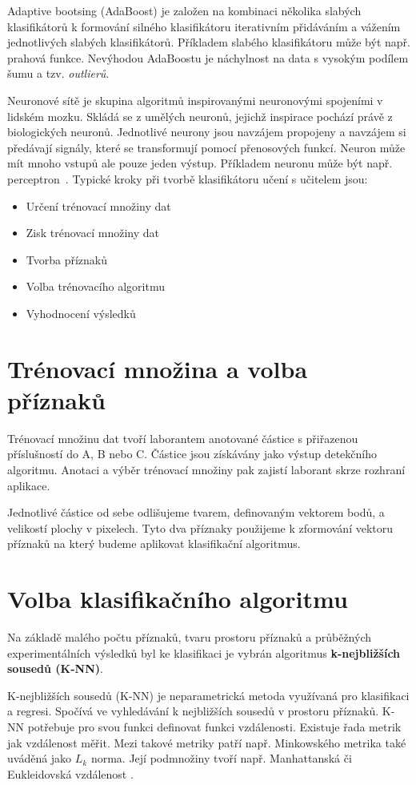 \documentclass[11pt,twoside,a4paper,table]{book}
\begin{document}
Adaptive bootsing (AdaBoost) je založen na kombinaci několika slabých klasifikátorů k formování silného klasifikátoru iterativním přidáváním a vážením jednotlivých slabých klasifikátorů. Příkladem slabého klasifikátoru může být např. prahová funkce. Nevýhodou AdaBoostu je náchylnost na data s vysokým podílem šumu a tzv. \textit{outlierů}.

Neuronové sítě je skupina algoritmů inspirovanými neuronovými spojeními v lidském mozku. Skládá se z umělých neuronů, jejichž inspirace pochází právě z biologických neuronů. Jednotlivé neurony jsou navzájem propojeny a navzájem si předávají signály, které se transformují pomocí přenosových funkcí. Neuron může mít mnoho vstupů ale pouze jeden výstup. Příkladem neuronu může být např. perceptron~\cite{art:neural_networks}. 
\newpage
Typické kroky při tvorbě klasifikátoru učení s učitelem jsou:
\begin{itemize}
\item Určení trénovací množiny dat
\item Zisk trénovací množiny dat
\item Tvorba příznaků
\item Volba trénovacího algoritmu
\item Vyhodnocení výsledků
\end{itemize}

\section{Trénovací množina a volba příznaků}
Trénovací množinu dat tvoří laborantem anotované částice s přiřazenou příslušností do A, B nebo C. Částice jsou získávány jako výstup detekčního algoritmu. Anotaci a výběr trénovací množiny pak zajistí laborant skrze rozhraní aplikace.

Jednotlivé částice od sebe odlišujeme tvarem, definovaným vektorem bodů, a velikostí plochy v pixelech. Tyto dva příznaky použijeme k zformování vektoru příznaků na který budeme aplikovat klasifikační algoritmus.

\section{Volba klasifikačního algoritmu}

Na základě malého počtu příznaků, tvaru prostoru příznaků a průběžných experimentálních výsledků byl ke klasifikaci je vybrán algoritmus \textbf{k-nejbližších sousedů (K-NN)}.

K-nejbližších sousedů (K-NN) je neparametrická metoda využívaná pro klasifikaci a regresi. Spočívá ve vyhledávání k nejbližších sousedů v prostoru příznaků. K-NN potřebuje pro svou funkci definovat funkci vzdálenosti. Existuje řada metrik jak vzdálenost měřit. Mezi takové metriky patří např. Minkowského metrika také uváděná jako $L_{k}$ norma. Její podmnožiny tvoří např. Manhattanská či Eukleidovská vzdálenost \cite{book:pattern_class}.
\end{document}
